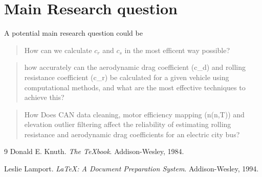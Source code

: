 \documentclass[12pt,a4paper]{article}
\begin{document}
\section{Main Research question}
A potential main research question could be \\
\begin{quote}
    How can we calculate $c_r$ and $c_s$ in the most efficent way possible? \\
\end{quote}
\begin{quote}
how accurately can the aerodynamic drag coefficient (c_d) and rolling resistance coefficient (c_r) be calculated for a given vehicle using computational methods, and what are the most effective techniques to achieve this? \\
\end{quote}
\begin{quote}
    How Does CAN data cleaning, motor efficiency mapping (n(n,T)) and elevation outlier filtering affect the reliability of estimating rolling resistance and aerodynamic drag coefficients for an electric city bus? \\
\end{quote}
\begin{thebibliography}{9}
    Donald E. Knuth.
    \textit{The \TeX book}. Addison-Wesley, 1984.

    Leslie Lamport.
    \textit{LaTeX: A Document Preparation System}. Addison-Wesley, 1994.
\end{thebibliography}
\end{document}
